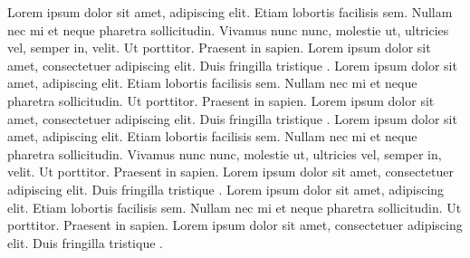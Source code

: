 \documentclass{article}
\begin{document}
    \beginnumbering
    \pstart
    Lorem ipsum dolor sit amet,
     adipiscing elit. Etiam
    lobortis facilisis sem. Nullam nec mi et neque pharetra
    sollicitudin. Vivamus nunc nunc, molestie ut, ultricies vel,
    semper in, velit.
    \pend
    \pstart
    Ut porttitor. Praesent in sapien. Lorem ipsum dolor sit amet,
    consectetuer adipiscing elit. Duis fringilla tristique
    .
    \pend
    \endnumbering
     \beginnumbering
     \pstart
     Lorem ipsum dolor sit amet,
      adipiscing elit. Etiam
     lobortis facilisis sem. Nullam nec mi et neque pharetra
     sollicitudin.
     \pend
     \pstart
     Ut porttitor. Praesent in sapien. Lorem ipsum dolor sit amet,
     consectetuer adipiscing elit. Duis fringilla tristique
     .
     \pend
     \endnumbering
\clearpage
    \beginnumbering
    \pstart
    Lorem ipsum dolor sit amet,
     adipiscing elit. Etiam
    lobortis facilisis sem. Nullam nec mi et neque pharetra
    sollicitudin. Vivamus nunc nunc, molestie ut, ultricies vel,
    semper in, velit.
    \pend
    \pstart
    Ut porttitor. Praesent in sapien. Lorem ipsum dolor sit amet,
    consectetuer adipiscing elit. Duis fringilla tristique
    .
    \pend
    \endnumbering
     \beginnumbering
     \pstart
     Lorem ipsum dolor sit amet,
      adipiscing elit. Etiam
     lobortis facilisis sem. Nullam nec mi et neque pharetra
     sollicitudin.
     \pend
     \pstart
     Ut porttitor. Praesent in sapien. Lorem ipsum dolor sit amet,
     consectetuer adipiscing elit. Duis fringilla tristique
     .
     \pend
     \endnumbering
 \Columns
\end{document}

